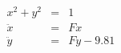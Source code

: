 \documentclass[preview]{standalone}
\begin{document}
$
\begin{array}{lcr}      
      x^2 + y^2 &=& 1\\
      \ddot{x} &=& F x \\
      \ddot{y} &=& F y - 9.81
\end{array}
$
\end{document}
